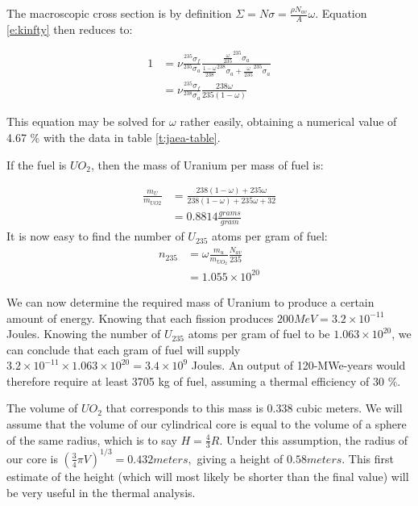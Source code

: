 \documentclass[12pt]{article}
\begin{document}
The macroscopic cross section is by definition $\Sigma = N \sigma = \frac{\rho N_{av}}{A} \omega$. Equation \ref{e:kinfty} then reduces to:

\begin{align}
1 &= \nu \frac{^{235}\sigma_f}{^{235}\sigma_a} \frac{\frac{\omega}{235} ^{235} \sigma_a}{\frac{1 - \omega}{238} ^{238} \sigma_a + \frac{\omega}{235} ^{235} \sigma_a} \\
 &= \nu \frac{^{235} \sigma_f}{^{238} \sigma_a} \frac{238 \omega}{235 (1 - \omega)} 
\end{align}

This equation may be solved for $\omega$ rather easily, obtaining a numerical value of 4.67 \% with the data in table \ref{t:jaea-table}. 

If the fuel is $UO_2$, then the mass of Uranium per mass of fuel is:

\begin{align}
\frac{m_U}{m_{UO2}} &= \frac{238 (1 - \omega) + 235 \omega}{238 (1 - \omega) + 235 \omega + 32} \\
 &= 0.8814 \frac{grams}{gram}
\end{align}
It is now easy to find the number of $U_{235}$ atoms per gram of fuel:
\begin{align}
n_{235} &= \omega \frac{m_u}{m_{UO_2}} \frac{N_{av}}{235} \\
 &= 1.055 \times 10^{20}
\end{align}


We can now determine the required mass of Uranium to produce a certain amount of energy. Knowing that each fission produces $200 MeV = 3.2 \times 10 ^ {-11}$ Joules. Knowing the number of $U_{235}$ atoms per gram of fuel to be $1.063 \times 10^{20}$, we can conclude that each gram of fuel will supply $3.2 \times 10 ^ {-11} \times 1.063 \times 10^{20} = 3.4 \times 10^9$ Joules. An output of 120-MWe-years would therefore require at least 3705 kg of fuel, assuming a thermal efficiency of 30 \%. 

The volume of $UO_2$ that corresponds to this mass is 0.338 cubic meters. We will assume that the volume of our cylindrical core is equal to the volume of a sphere of the same radius, which is to say $H = \frac{4}{3} R$. Under this assumption, the radius of our core is $(\frac{3}{4} \pi V) ^ {1/3} = 0.432 meters,$ giving a height of $0.58 meters$. This first estimate of the height (which will most likely be shorter than the final value) will be very useful in the thermal analysis.
\end{document}
